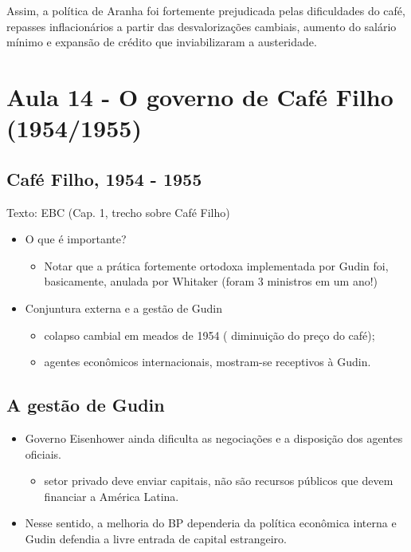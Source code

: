 \documentclass[a4paper,12pt]{article}[abntex2]
\begin{document}
Assim, a política de Aranha foi fortemente prejudicada pelas dificuldades do café, repasses inflacionários a partir das desvalorizações cambiais, aumento do salário mínimo e expansão de crédito que inviabilizaram a austeridade.


\section{\textbf{Aula 14 - O governo de Café Filho (1954/1955)}}

\subsection{Café Filho, 1954 - 1955}
Texto: EBC (Cap. 1, trecho sobre Café Filho) 
\begin{itemize}
    \item O que é importante?
    \begin{itemize}
        \item Notar que a prática fortemente ortodoxa implementada por Gudin foi, basicamente, anulada por Whitaker (foram 3 ministros em um ano!)
    \end{itemize}
    \item Conjuntura externa e a gestão de Gudin   
    \begin{itemize}
        \item colapso cambial em meados de 1954 ( diminuição do preço do café);
        \item  agentes econômicos internacionais, mostram-se receptivos à Gudin.
    \end{itemize}
\end{itemize}

\subsection{A gestão de Gudin}
\begin{itemize}
    \item Governo Eisenhower ainda dificulta as negociações e a disposição dos agentes oficiais.
    \begin{itemize}
        \item  setor privado deve enviar capitais, não são recursos públicos que devem financiar a América Latina.
    \end{itemize}
    \item Nesse sentido, a melhoria do BP dependeria da política econômica interna e Gudin defendia a livre entrada de capital estrangeiro.
\end{itemize}
\end{document}
